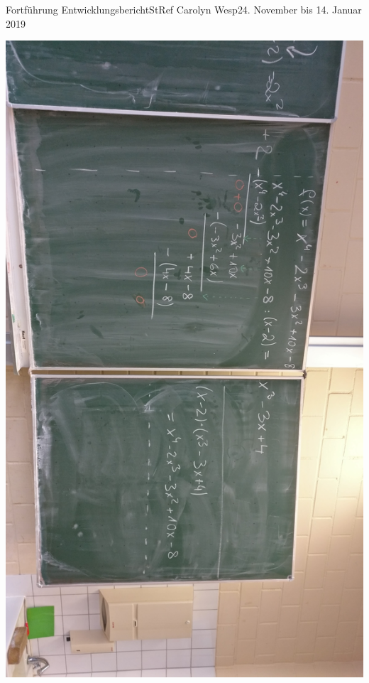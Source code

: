 \documentclass[oneside,openany,headings=optiontotoc,11pt,numbers=noenddot]{article}
\begin{document}
\begin{worksheet}{Fortführung Entwicklungsbericht}{StRef\grq{} Carolyn Wesp}{24. November bis 14. Januar 2019}
\begin{minipage}{0.48\textwidth}
			\includegraphics[width=\textwidth]{../Polynomdivision_2.jpg}
		\end{minipage}

\end{worksheet}
\end{document}
